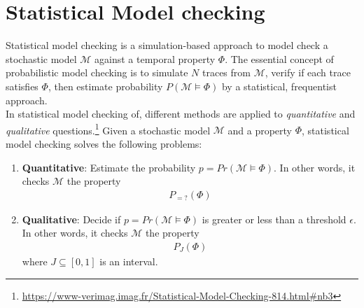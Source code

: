 \section{Statistical Model checking}
Statistical model checking is a simulation-based approach to model check a stochastic model
$\mathcal{M}$ against a temporal property $\Phi$. The essential concept of probabilistic model
checking is to simulate $N$ traces from $\mathcal{M}$, verify if each trace satisfies $\Phi$, then
estimate probability $P(\mathcal{M}\models\Phi)$ by a statistical, frequentist approach.\\
In statistical model checking of, different methods are applied to \textit{quantitative} and
\textit{qualitative}
questions.\footnote{\url{https://www-verimag.imag.fr/Statistical-Model-Checking-814.html\#nb3}}
Given a stochastic model $\mathcal{M}$ and a property $\Phi$, statistical model checking solves the
following problems:
\begin{enumerate}
    \item \textbf{Quantitative}: Estimate the probability $p = Pr(\mathcal{M}\models\Phi)$. In other
          words, it checks $\mathcal{M}$ the property \begin{align*}
              P_{=?}(\Phi)
          \end{align*}
    \item \textbf{Qualitative}: Decide if $p = Pr(\mathcal{M}\models\Phi)$ is greater or less than a
          threshold $\epsilon$. In other words, it checks $\mathcal{M}$ the property \begin{align*}
              P_J(\Phi)
          \end{align*}
          where $J\subseteq[0,1]$ is an interval.
\end{enumerate}

